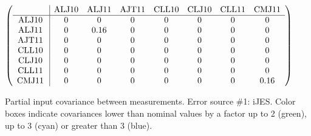 \begin{table}[H]
\scriptsize
\begin{center}
\renewcommand{\arraystretch}{1.1}
\begin{math}\left(\begin{array}{c|ccccccc}
 & \mathrm{ALJ10} & 
\mathrm{ALJ11} & 
\mathrm{AJT11} & 
\mathrm{CLL10} & 
\mathrm{CLJ10} & 
\mathrm{CLL11} & 
\mathrm{CMJ11} \\
\hline
\mathrm{ALJ10} \hspace*{2pt} &  0 &  0 &  0 &  0 &  0 &  0 &  0 \\
\mathrm{ALJ11} \hspace*{2pt} &  0 &       0.16 &  0 &  0 &  0 &  0 &  0 \\
\mathrm{AJT11} \hspace*{2pt} &  0 &  0 &  0 &  0 &  0 &  0 &  0 \\
\mathrm{CLL10} \hspace*{2pt} &  0 &  0 &  0 &  0 &  0 &  0 &  0 \\
\mathrm{CLJ10} \hspace*{2pt} &  0 &  0 &  0 &  0 &  0 &  0 &  0 \\
\mathrm{CLL11} \hspace*{2pt} &  0 &  0 &  0 &  0 &  0 &  0 &  0 \\
\mathrm{CMJ11} \hspace*{2pt} &  0 &  0 &  0 &  0 &  0 &  0 &       0.16 \\
\end{array}\right)\end{math}
\caption{Partial input covariance between measurements. Error source \#1: iJES. Color boxes indicate covariances lower than nominal values by a factor up to 2 (green), up to 3 (cyan) or greater than 3 (blue).}
\renewcommand{\arraystretch}{1}
\end{center}
\end{table}
